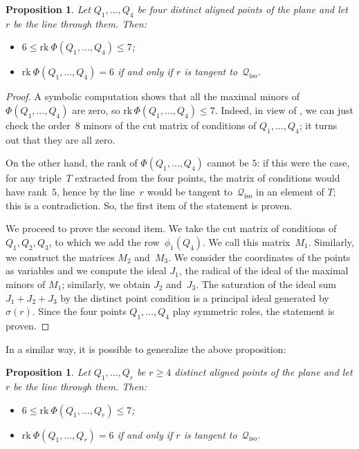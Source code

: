 \documentclass{amsart}
\theoremstyle{plain}
\newtheorem{prop}[lemma]{Proposition}
\theoremstyle{definition}
\newcommand{\iso}{\mathcal{Q}_{\mathrm{iso}}}
\newcommand{\rk}{\ensuremath{\mathrm{rk}}}
\begin{document}
\begin{prop}
\label{proposition:four_aligned}
Let $Q_1, \dotsc, Q_4$ be four distinct aligned points of the plane and
let $r$ be the line through them. Then:
\begin{itemize}
\item $6 \leq \rk \ \Phi(Q_1, \dotsc, Q_4) \leq 7$;
\item $\rk \ \Phi(Q_1, \dotsc, Q_4) = 6$ if and only if $r$ is tangent
to~$\iso$.
\end{itemize}
\end{prop}
\begin{proof}
  A symbolic computation shows that all the maximal minors of~$\Phi(Q_1, \dotsc, Q_4)$ are
  zero, so
  \mbox{$\rk \, \Phi(Q_1, \dotsc, Q_4) \leq 7$}.
  Indeed, in view of , we can just check the order~$8$ minors of the cut matrix of conditions of $Q_1, \dotsc, Q_4$; it turns out that they are all zero.

  On the other hand, the rank of $\Phi(Q_1, \dotsc, Q_4)$ cannot be $5$:
  if this were the case, for any triple~$T$ extracted from the four points, the matrix of conditions would have rank~$5$, hence by  the line~$r$ would be tangent to~$\iso$ in an element of $T$; this is a contradiction.
  So, the first item of the statement is proven.

  We proceed to prove the second item.
  We take the cut matrix of conditions of~$Q_1, Q_2, Q_3$, to which we add the row~$\phi_1(Q_4)$.
  We call this matrix~$M_1$.
  Similarly, we construct the matrices $M_2$ and~$M_3$.
  We consider the coordinates of the points as variables and we compute
  the ideal $J_1$, the radical of the ideal of the maximal minors of $M_1$; similarly, we obtain $J_2$ and~$J_3$.
  The saturation of the ideal sum $J_1 + J_2 + J_3$ by the distinct point condition is a principal ideal generated by~$\sigma(r)$.
  Since the four points $Q_1, \dotsc, Q_4$ play symmetric roles, the statement is proven.
\end{proof}

In a similar way, it is possible to generalize the above proposition:
\begin{prop}
\label{proposition:n_aligned}
Let $Q_1, \dotsc, Q_r$ be $r\geq 4$ distinct aligned points of the plane and
let $r$ be the line through them. Then:
\begin{itemize}
\item $6 \leq \rk \ \Phi(Q_1, \dotsc, Q_r) \leq 7$;
\item $\rk \ \Phi(Q_1, \dotsc, Q_r) = 6$ if and only if $r$ is tangent
to~$\iso$.
\end{itemize}
\end{prop}
\end{document}
